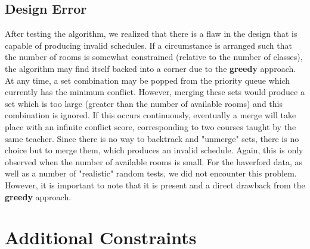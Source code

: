 \documentclass[11pt, oneside]{article}   	%
\begin{document}
\subsection{Design Error}
After testing the algorithm, we realized that there is a flaw in the design that is capable of producing invalid schedules. If a circumstance is arranged such that the number of rooms is somewhat constrained (relative to the number of classes), the algorithm may find itself backed into a corner due to the \textbf {greedy} approach. At any time, a set combination may be popped from the priority queue which currently has the minimum conflict. However, merging these sets would produce a set which is too large (greater than the number of available rooms) and this combination is ignored. If this occurs continuously, eventually a merge will take place with an infinite conflict score, corresponding to two courses taught by the same teacher. Since there is no way to backtrack and "unmerge" sets, there is no choice but to merge them, which produces an invalid schedule. Again, this is only observed when the number of available rooms is small. For the haverford data, as well as a number of "realistic" random tests, we did not encounter this problem. However, it is important to note that it is present and a direct drawback from the \textbf {greedy} approach.

\section{Additional Constraints}
\end{document}
